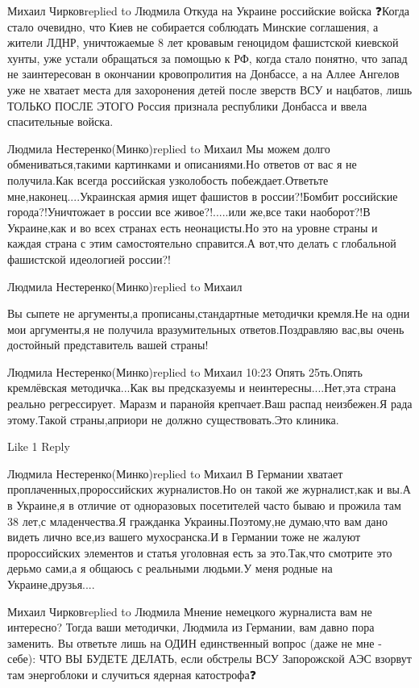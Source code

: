 Михаил Чирковreplied to Людмила
Откуда на Украине российские войска ❓Когда стало очевидно, что Киев не собирается соблюдать Минские соглашения, а жители ЛДНР, уничтожаемые 8 лет кровавым геноцидом фашистской киевской хунты, уже устали обращаться за помощью к РФ, когда стало понятно, что запад не заинтересован в окончании кровопролития на Донбассе, а на Аллее Ангелов уже не хватает места для захоронения детей после зверств ВСУ и нацбатов, лишь
ТОЛЬКО ПОСЛЕ ЭТОГО Россия признала республики Донбасса и ввела спасительные войска.

Людмила Нестеренко(Минко)replied to Михаил
Мы можем долго обмениваться,такими картинками и описаниями.Но ответов от вас я не получила.Как всегда российская узколобость побеждает.Ответьте мне,наконец....Украинская армия ищет фашистов в россии?!Бомбит российские города?!Уничтожает в россии все живое?!.....или же,все таки наоборот?!В Украине,как и во всех странах есть неонацисты.Но это на уровне страны и каждая страна с этим самостоятельно справится.А вот,что делать с глобальной фашистской идеологией россии?!


Людмила Нестеренко(Минко)replied to Михаил

Вы сыпете не аргументы,а прописаны,стандартные методички кремля.Не на одни мои аргументы,я не получила вразумительных ответов.Поздравляю вас,вы очень достойный представитель вашей страны!🤔🤔🤔😂😂😂😂😂

Людмила Нестеренко(Минко)replied to Михаил
10:23
Опять 25ть.Опять кремлёвская методичка...Как вы предсказуемы и неинтересны....Нет,эта страна реально регрессирует. Маразм и паранойя крепчает.Ваш распад неизбежен.Я рада этому.Такой страны,априори не должно существовать.Это клиника.

    Like 1
    Reply

Людмила Нестеренко(Минко)replied to Михаил
В Германии хватает проплаченных,пророссийских журналистов.Но он такой же журналист,как и вы.А в Украине,я в отличие от одноразовых посетителей часто бываю и прожила там 38 лет,с младенчества.Я гражданка Украины.Поэтому,не думаю,что вам дано видеть лично все,из вашего мухосранска.И в Германии тоже не жалуют пророссийских элементов и статья уголовная есть за это.Так,что смотрите это дерьмо сами,а я общаюсь с реальными людьми.У меня родные на Украине,друзья....

Михаил Чирковreplied to Людмила
Мнение немецкого журналиста вам не интересно?
Тогда ваши методички, Людмила из Германии, вам давно пора заменить.
Вы ответьте лишь на ОДИН единственный вопрос (даже не мне - себе):
ЧТО ВЫ БУДЕТЕ ДЕЛАТЬ, если обстрелы ВСУ Запорожской АЭС взорвут там энергоблоки и случиться ядерная катострофа❓



